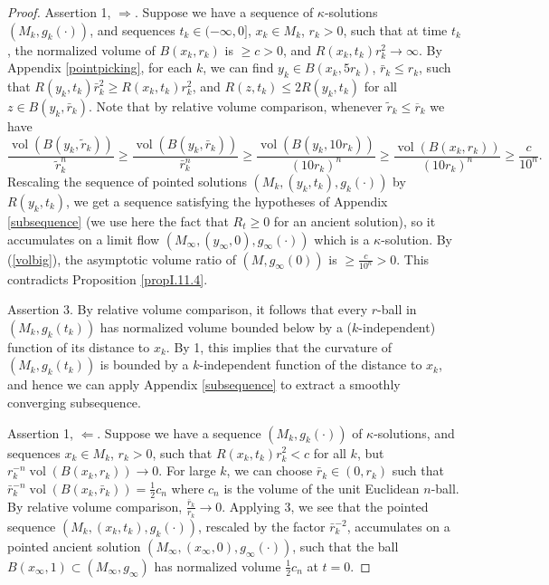 \documentclass[12pt]{amsart}
\newcommand{\vol}{\operatorname{vol}}
\newcommand{\ra}{\rightarrow}
\numberwithin{equation}{section}
\theoremstyle{plain}
\theoremstyle{definition}
\theoremstyle{remark}
\begin{document}
\begin{proof}
Assertion 1, $\Longrightarrow$.  
Suppose we have a sequence of $\kappa$-solutions
$(M_k,g_k(\cdot))$, and sequences 
$t_k\in (-\infty, 0]$, $x_k\in M_k$, $r_k>0$, such that at time $t_k$,
the normalized volume of $B(x_k,r_k)$ is 
$\geq c>0$, and $R(x_k,t_k)r_k^2\ra \infty$.
By Appendix \ref{pointpicking}, 
for each $k$, we can find $y_k\in B(x_k,5r_k)$, 
$\bar r_k\leq r_k$, such that $R(y_k,t_k)\bar r_k^2\geq R(x_k,t_k)r_k^2$,
and $R(z,t_k)\leq 2R(y_k,t_k)$ for all $z\in B(y_k,\bar r_k)$. 
Note that by relative volume comparison,
whenever $\widetilde{r}_k \le \overline{r}_k$ we have
\begin{equation}
\label{volbig}
\frac{\vol(B(y_k,{\widetilde r}_k))}{\widetilde{r}_k^n}\geq
\frac{\vol(B(y_k,\bar r_k))}{\bar r_k^n}\geq 
\frac{\vol(B(y_k,10r_k))}{(10r_k)^n}
\geq \frac{\vol(B(x_k,r_k))}{(10r_k)^n}\geq\frac{c}{10^n}.
\end{equation}
Rescaling the sequence of pointed solutions $(M_k,(y_k,t_k),g_k(\cdot))$
by $R(y_k,t_k)$, we get a sequence satisfying the hypotheses
of Appendix \ref{subsequence} (we use here the fact that $R_t \ge 0$
for an ancient solution), so it accumulates on a limit
flow $(M_\infty,(y_\infty,0),g_\infty(\cdot))$ which is 
a $\kappa$-solution.   
By (\ref{volbig}), the asymptotic volume ratio of $(M,g_\infty(0))$ is 
$\geq \frac{c}{10^n}>0$.  This contradicts Proposition \ref{propI.11.4}.


\bigskip
Assertion 3.  By relative volume comparison, it follows that  every 
$r$-ball in $(M_k,g_k(t_k))$ has normalized volume bounded below
by a ($k$-independent) function of its distance to $x_k$.
By 1, this implies that  the curvature of $(M_k,g_k(t_k))$ is bounded
by a $k$-independent function of the distance to $x_k$, 
and hence we can apply Appendix \ref{subsequence} to extract
a smoothly converging subsequence.

\bigskip
Assertion 1, $\Longleftarrow$.  Suppose we have a sequence
$(M_k,g_k(\cdot))$ of $\kappa$-solutions, and sequences
$x_k\in M_k$, $r_k>0$, such that $R(x_k,t_k)r_k^2<c$ for all
$k$, but $r_k^{-n}\vol(B(x_k,r_k))\ra 0$.
For large $k$, we can choose $\bar r_k \in (0, r_k)$ such that
$\bar r_k^{-n}\vol(B(x_k,\bar r_k))=\frac{1}{2}c_n$
where $c_n$ is the volume of the unit Euclidean $n$-ball.
By relative volume comparison, $\frac{\bar r_k}{r_k}\ra 0$.
Applying 3, we see that the pointed sequence $(M_k,(x_k,t_k),g_k(\cdot))$,
rescaled by the factor $\bar r_k^{-2}$, accumulates
on a pointed ancient solution $(M_\infty,(x_\infty,0),g_\infty(\cdot))$,
such that the ball $B(x_\infty,1)\subset (M_\infty,g_\infty)$ has 
normalized volume $\frac{1}{2}c_n$ at $t=0$.


\end{proof}
\end{document}
